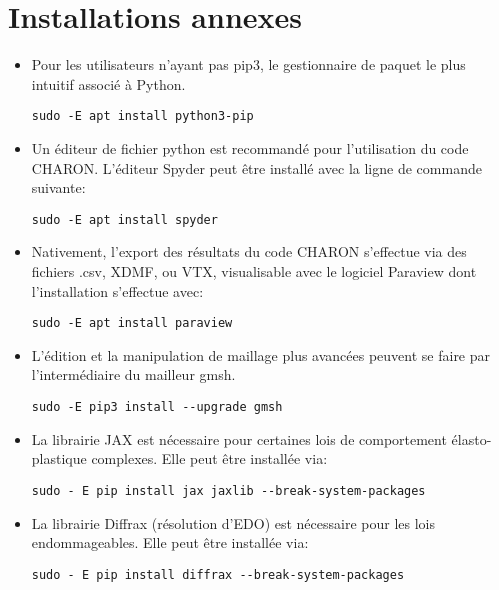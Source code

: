 \documentclass[10pt]{book}
\begin{document}
\section{Installations annexes}\label{Section:Installations annexes}
\begin{itemize}
\item Pour les utilisateurs n'ayant pas pip3, le gestionnaire de paquet le plus intuitif associé à Python.
\begin{verbatim}
sudo -E apt install python3-pip
\end{verbatim}
\item Un éditeur de fichier python est recommandé pour l'utilisation du code CHARON. L’éditeur Spyder peut être installé avec la ligne de commande suivante:
\begin{verbatim}
sudo -E apt install spyder
\end{verbatim}
\item Nativement, l'export des résultats du code CHARON s'effectue via des fichiers .csv, XDMF, ou VTX, visualisable avec le logiciel Paraview dont l'installation s'effectue avec:
\begin{verbatim}
sudo -E apt install paraview
\end{verbatim}
\item L'édition et la manipulation de maillage plus avancées peuvent se faire par l'intermédiaire du mailleur gmsh.
\begin{verbatim}
sudo -E pip3 install --upgrade gmsh
\end{verbatim}
\item La librairie JAX est nécessaire pour certaines lois de comportement élasto-plastique complexes. Elle peut être installée via:
\begin{verbatim}
sudo - E pip install jax jaxlib --break-system-packages
\end{verbatim}
\item La librairie Diffrax (résolution d'EDO) est nécessaire pour les lois endommageables. Elle peut être installée via:
\begin{verbatim}
sudo - E pip install diffrax --break-system-packages
\end{verbatim}
\end{itemize}
\end{document}
